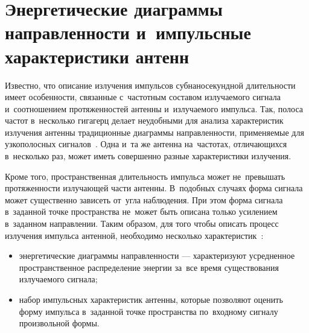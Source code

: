 
\section[Энергетические диаграммы направленности]
        {Энергетические диаграммы направленности и~импульсные характеристики антенн}
\label{div:DirectionalPatternsTheory}

Известно, что описание излучения импульсов субнаносекундной длительности имеет
особенности, связанные с~частотным составом излучаемого сигнала и~соотношением
протяженностей антенны и~излучаемого импульса. Так, полоса частот в~несколько
гигагерц делает неудобными для анализа характеристик излучения антенны
традиционные диаграммы направленности, применяемые для узкополосных
сигналов~\cite{bib:Immoreev2002}. Одна и~та же антенна на~частотах, отличающихся
в~несколько раз, может иметь совершенно разные характеристики излучения.

Кроме того, пространственная длительность импульса может не~превышать
протяженности излучающей части антенны. В~подобных случаях форма сигнала может
существенно зависеть от~угла наблюдения. При этом форма сигнала в~заданной точке
пространства не~может быть описана только усилением в~заданном направлении.
Таким образом, для того чтобы описать процесс излучения импульса антенной,
необходимо несколько характеристик~\cite{bib:Immoreev2002,bib:Astanin1989}:
\begin{itemize}
\item
энергетические диаграммы направленности --- характеризуют усредненное
пространственное распределение энергии за~все время существования излучаемого
сигнала;
\item
набор импульсных характеристик антенны, которые позволяют оценить форму импульса
в~заданной точке пространства по~входному сигналу произвольной формы.
\end{itemize}

